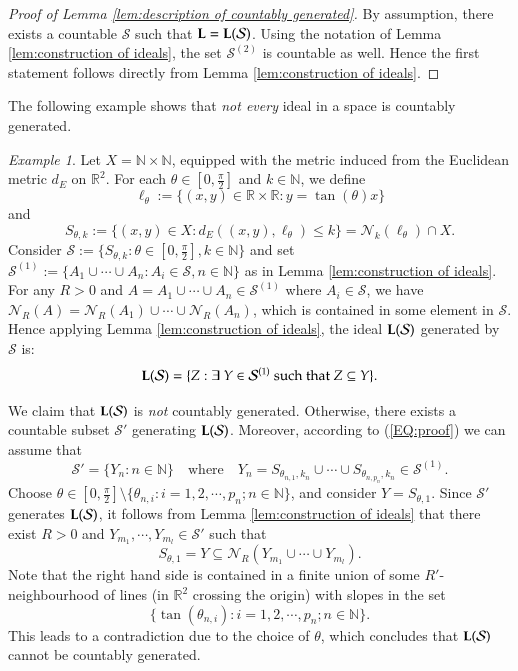 \documentclass[12pt, a4paper]{amsart}
\numberwithin{equation}{section}
\theoremstyle{definition}
\theoremstyle{remark}
\newtheorem{ex}[thm]{Example}
\def\NN{\mathbb{N}}
\def\RR{\mathbb{R}}
\def\L{\mathcal{L}}
\def\Nd{\mathcal{N}}
\def\S{\mathcal{S}}
\def\L{{\bf L}}
\begin{document}
\begin{proof}[Proof of Lemma \ref{lem:description of countably generated}]
By assumption, there exists a countable $\S$ such that $\L= \L(\S)$. Using the notation of Lemma \ref{lem:construction of ideals}, the set $\S^{(2)}$ is countable as well. Hence the first statement follows directly from Lemma \ref{lem:construction of ideals}. 
\end{proof}

The following example shows that \emph{not every} ideal in a space is countably generated.

\begin{ex}\label{ex:noncountably generated ideal}
Let $X = \NN \times \NN$, equipped with the metric induced from the Euclidean metric $d_E$ on $\RR^2$. For each $\theta \in [0, \frac{\pi}{2}]$ and $k\in \NN$, we define 
\[
\ell_\theta:=\{(x,y) \in \RR \times \RR: y=\tan(\theta)x\}
\]
and
\[
S_{\theta,k}:=\{(x,y) \in X: d_E((x,y), \ell_\theta) \leq k\} = \Nd_k(\ell_\theta) \cap X.
\]
Consider $\S:=\{S_{\theta,k}: \theta \in [0, \frac{\pi}{2}], k\in \NN\}$ and set $\S^{(1)}:=\{A_1 \cup \cdots \cup A_n: A_i \in \S, n\in \NN\}$ as in Lemma \ref{lem:construction of ideals}. For any $R>0$ and $A= A_1 \cup \cdots \cup A_n\in \S^{(1)}$ where $A_i \in \S$, we have $\Nd_R(A) = \Nd_R(A_1) \cup \cdots \cup \Nd_R(A_n)$, which is contained in some element in $\S$. Hence applying Lemma \ref{lem:construction of ideals}, the ideal $\L(\S)$ generated by $\S$ is:
\begin{equation}\label{EQ:proof}
\L(\S)= \{Z: \exists~Y \in \S^{(1)} \text{ such that } Z \subseteq Y\}.
\end{equation}

We claim that $\L(\S)$ is \emph{not} countably generated. Otherwise, there exists a countable subset $\S'$ generating $\L(\S)$. Moreover, according to (\ref{EQ:proof}) we can assume that
\[
\S' = \{Y_n: n\in \NN\} \quad \text{where} \quad Y_n=S_{\theta_{n,1}, k_n} \cup \cdots \cup S_{\theta_{n,p_n}, k_{n}} \in \S^{(1)}.
\]
Choose $\theta \in [0,\frac{\pi}{2}] \setminus \{\theta_{n,i}: i=1,2,\cdots, p_n; n\in \NN\}$, and consider $Y=S_{\theta,1}$. Since $\S'$ generates $\L(\S)$, it follows from Lemma \ref{lem:construction of ideals} that there exist $R>0$ and $Y_{m_1}, \cdots, Y_{m_l} \in \S'$ such that 
\[
S_{\theta,1}  =Y \subseteq \Nd_R(Y_{m_1}\cup \cdots\cup Y_{m_l}).
\]
Note that the right hand side is contained in a finite union of some $R'$-neighbourhood of lines (in $\RR^2$ crossing the origin) with slopes in the set 
\[
\big\{\tan(\theta_{n,i}): i=1,2,\cdots, p_n; n\in \NN\big\}.
\] 
This leads to a contradiction due to the choice of $\theta$, which concludes that $\L(\S)$ cannot be countably generated. 
\end{ex}
\end{document}
